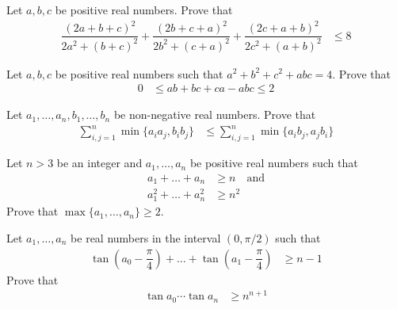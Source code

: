 \documentclass{subfile}
\begin{document}
		\begin{problem}
			Let $a,b,c$ be positive real numbers. Prove that
				\begin{align*}
					\dfrac{(2a+b+c)^{2}}{2a^{2}+(b+c)^{2}}+\dfrac{(2b+c+a)^{2}}{2b^{2}+(c+a)^{2}}+\dfrac{(2c+a+b)^{2}}{2c^{2}+(a+b)^{2}}
						& \leq 8
				\end{align*}
		\end{problem}
	
		\begin{problem}
			Let $a,b,c$ be positive real numbers such that $a^{2}+b^{2}+c^{2}+abc=4$. Prove that
				\begin{align*}
					0
						& \leq ab+bc+ca-abc\leq 2
				\end{align*}
		\end{problem}
	
		\begin{problem}
			Let $a_{1},\ldots,a_{n},b_{1},\ldots,b_{n}$ be non-negative real numbers. Prove that
				\begin{align*}
					\sum_{i,j=1}^{n}\min\{a_{i}a_{j},b_{i}b_{j}\}
						& \leq\sum_{i,j=1}^{n}\min\{a_{i}b_{j},a_{j}b_{i}\}
				\end{align*}
		\end{problem}
	
		\begin{problem}
			Let $n>3$ be an integer and $a_{1},\ldots,a_{n}$ be positive real numbers such that
				\begin{align*}
					a_{1}+\ldots+a_{n}
						& \geq n\quad\mbox{and}\\
					a_{1}^{2}+\ldots+a_{n}^{2}
						& \geq n^{2}
				\end{align*}
			Prove that $\max\{a_{1},\ldots,a_{n}\}\geq2$.
		\end{problem}
	
		\begin{problem}
			Let $a_{1},\ldots,a_{n}$ be real numbers in the interval $(0,\pi/2)$ such that
				\begin{align*}
					\tan\left(a_{0}-\dfrac{\pi}{4}\right)+\ldots+\tan\left(a_{1}-\dfrac{\pi}{4}\right)
						& \geq n-1
				\end{align*}
			Prove that
				\begin{align*}
					\tan{a_{0}}\cdots\tan{a_{n}}
						& \geq n^{n+1}
				\end{align*}
		\end{problem}
	
\end{document}

